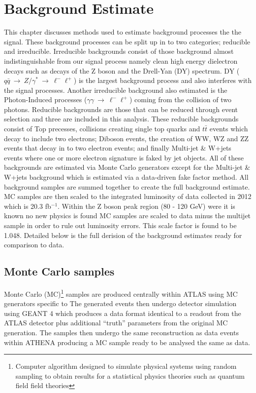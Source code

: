 \chapter{Background Estimate}

This chapter discusses methods used to estimate background processes the the signal. These background processes can be split up in to two categories; reducible and irreducible. Irreducible backgrounds consist of those background almost indistinguishable from our signal process namely clean high energy dielectron decays such as decays of the Z boson and the Drell-Yan (DY) spectrum. DY ($q\bar{q}~\rightarrow~Z/\gamma^{*}~\rightarrow~\ell^{-}\ell^{+}$) is the largest background process and also interferes with the signal processes. Another irreducible background also estimated is the Photon-Induced processes ($\gamma\gamma~\rightarrow~\ell^{-}\ell^{+}$) coming from the collision of two photons. Reducible backgrounds are those that can be reduced through event selection and three are included in this analysis. These reducible backgrounds consist of Top precesses, collisions creating single top quarks and $t\bar{t}$ events which decay to include two electrons; Diboson events, the creation of WW, WZ and ZZ events that decay in to two electron events; and finally Multi-jet \& W+jets events where one or more electron signature is faked by jet objects. All of these backgrounds are estimated via Monte Carlo generators except for the Multi-jet \& W+jets background which is estimated via a data-driven fake factor method. All background samples are summed together to create the full background estimate. MC samples are then scaled to the integrated luminosity of data collected in 2012 which is 20.3 fb$^{-1}$. Within the Z boson peak region (80 - 120 GeV) were it is known no new physics is found MC samples are scaled to data minus the multijet sample in order to rule out luminosity errors. This scale factor is found to be 1.048. Detailed below is the full derision of the background estimates ready for comparison to data.

\section{Monte Carlo samples}
   \label{sec:MC}

   Monte Carlo (MC)\footnote{Computer algorithm designed to simulate physical systems using random sampling to obtain results for a statistical physics theories such as quantum field field theories} samples are produced centrally within ATLAS using MC generators specific to  The generated events then undergo detector simulation using GEANT 4 \cite{Agostinelli2003250} which produces a data format identical to a readout from the ATLAS detector plus additional ``truth'' parameters from the original MC generation. The samples then undergo the same reconstruction as data events within ATHENA producing a MC sample ready to be analysed the same as data.\\


